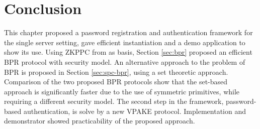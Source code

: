 


\section{Conclusion} \label{sec:vpake-conclusion}
This chapter proposed a password registration and authentication framework for the single server setting, gave efficient instantiation and a demo application to show its use.
Using \ac{ZKPPC} from as basis, Section \ref{sec:bpr} proposed an efficient \acl{BPR} protocol with security model.
An alternative approach to the problem of \ac{BPR} is proposed in Section \ref{sec:spc-bpr}, using a set theoretic approach.
Comparison of the two proposed \ac{BPR} protocols show that the set-based approach is significantly faster due to the use of symmetric primitives, while requiring a different security model.
The second step in the framework, password-based authentication, is solve by a new \ac{VPAKE} protocol.
Implementation and demonstrator showed practicability of the proposed approach.
